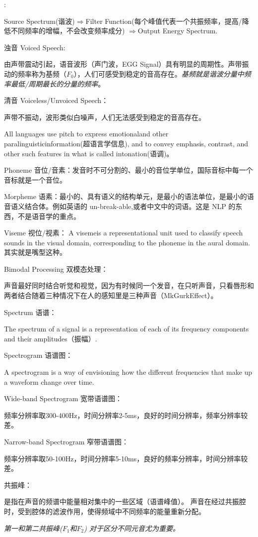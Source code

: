 :

Source Spectrum(谐波)$\Rightarrow$Filter Function(每个峰值代表一个共振频率，提高/降低不同频率的增幅，不会改变频率成分) $\Rightarrow$Output Energy Spectrum.


浊音 Voiced Speech:

由声带震动引起，语音波形（声门波，EGG Signal）具有明显的周期性。声带振动的频率称为基频（$F_0$），人们可感受到稳定的音高存在。\emph{基频就是谐波分量中频率最低/周期最长的分量的频率}。

清音 Voiceless/Unvoiced Speech：

声带不振动，波形类似白噪声，人们无法感受到稳定的音高存在。

All languages use pitch to express emotionaland other paralinguisticinformation(超语言学信息), and to convey emphasis, contrast, and other such features in what is called intonation(语调)。

Phoneme 音位/音素：发音时不可分割的、最小的音位学单位，国际音标中每一个音标就是一个音位。

Morpheme 语素：最小的、具有语义的结构单元，是最小的语法单位，是最小的语音语义结合体。例如英语的 un-break-able,或者中文中的词语。这是 NLP 的东西，不是语音学的重点。

Viseme 视位/视素：
A visemeis a representational unit used to classify speech sounds in the visual domain, corresponding to the phoneme in the aural domain.
其实就是嘴型这种。

Bimodal Processing 双模态处理：

声音最好同时结合听觉和视觉，因为有时候同一个发音，在只听声音，只看唇形和两者结合随着三种情况下在人的感知里是三种声音（MkGurkEffect）。

Spectrum 语谱：

The spectrum of a signal is a representation of each of its frequency components and their amplitudes（振幅）.

Spectrogram 语谱图：

A spectrogram is a way of envisioning how the different frequencies that make up a waveform change over time.

Wide-band Spectrogram 宽带语谱图：

频率分辨率取300-400Hz，时间分辨率2-5ms，良好的时间分辨率，频率分辨率较差。

Narrow-band Spectrogram 窄带语谱图：

频率分辨率取50-100Hz，时间分辨率5-10ms，良好的频率分辨率，时间分辨率较差。

共振峰：

是指在声音的频谱中能量相对集中的一些区域（语谱峰值）。
声音在经过共振腔时，受到腔体的滤波作用，使得频域中不同频率的能量重新分配。

\emph{第一和第二共振峰($F_1$和$F_2$) 对于区分不同元音尤为重要。}